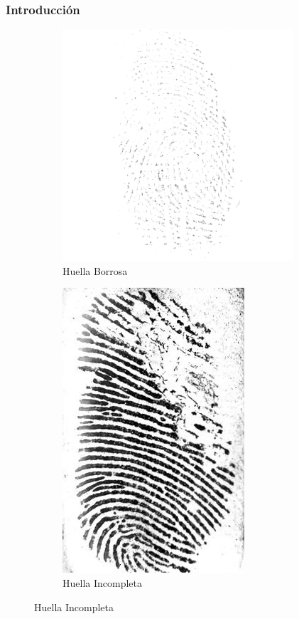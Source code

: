 \documentclass{beamer}
\begin{document}
\begin{frame}
\frametitle{Introducción}

\begin{figure}[h]
\begin{subfigure}{0.4\textwidth}
  \centering
  \includegraphics[scale=0.4]{figs/deteriorada_0.png}  
  \caption{Huella Borrosa}
  \label{fig:sub-first}
\end{subfigure}
\begin{subfigure}{0.4\textwidth}
  \centering
  \includegraphics[scale=0.42]{figs/deteriorada_1.jpg}  
  \caption{Huella Incompleta}
  \label{fig:sub-second}
\end{subfigure}

\label{fig:fig}
\end{figure}

\end{frame}
\end{document}
